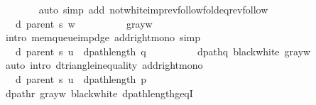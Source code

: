 \begin{isabellebody}
\ \ \ \ \ \ \isamarkupfalse%
\ {\isacharparenleft}{\kern0pt}auto\ simp\ add{\isacharcolon}{\kern0pt}\ not{\isacharunderscore}{\kern0pt}white{\isacharunderscore}{\kern0pt}imp{\isacharunderscore}{\kern0pt}rev{\isacharunderscore}{\kern0pt}follow{\isacharunderscore}{\kern0pt}fold{\isacharunderscore}{\kern0pt}eq{\isacharunderscore}{\kern0pt}rev{\isacharunderscore}{\kern0pt}follow{\isacharparenright}{\kern0pt}\isanewline
\ \ \ \ \isamarkupfalse%
\ \isamarkupfalse%
\ {\isachardoublequoteopen}{\isachardot}{\kern0pt}{\isachardot}{\kern0pt}{\isachardot}{\kern0pt}\ {\isasymle}\ d\ {\isacharparenleft}{\kern0pt}parent\ s{\isacharparenright}{\kern0pt}\ w\ {\isacharplus}{\kern0pt}\ {}{\isachardoublequoteclose}\isanewline
\ \ \ \ \ \ \isamarkupfalse%
\ gray{\isacharunderscore}{\kern0pt}w\isanewline
\ \ \ \ \ \ \isamarkupfalse%
\ {\isacharparenleft}{\kern0pt}intro\ mem{\isacharunderscore}{\kern0pt}queue{\isacharunderscore}{\kern0pt}imp{\isacharunderscore}{\kern0pt}d{\isacharunderscore}{\kern0pt}ge\ add{\isacharunderscore}{\kern0pt}right{\isacharunderscore}{\kern0pt}mono{\isacharparenright}{\kern0pt}\ simp\isanewline
\ \ \ \ \isamarkupfalse%
\ \isamarkupfalse%
\ {\isachardoublequoteopen}{\isachardot}{\kern0pt}{\isachardot}{\kern0pt}{\isachardot}{\kern0pt}\ {\isasymle}\ d\ {\isacharparenleft}{\kern0pt}parent\ s{\isacharparenright}{\kern0pt}\ u\ {\isacharplus}{\kern0pt}\ dpath{\isacharunderscore}{\kern0pt}length\ q\ {\isacharplus}{\kern0pt}\ {}{\isachardoublequoteclose}\isanewline
\ \ \ \ \ \ \isamarkupfalse%
\ dpath{\isacharunderscore}{\kern0pt}q\ black{\isacharunderscore}{\kern0pt}white\ gray{\isacharunderscore}{\kern0pt}w\isanewline
\ \ \ \ \ \ \isamarkupfalse%
\ {\isacharparenleft}{\kern0pt}auto\ intro{\isacharcolon}{\kern0pt}\ d{\isacharunderscore}{\kern0pt}triangle{\isacharunderscore}{\kern0pt}inequality\ add{\isacharunderscore}{\kern0pt}right{\isacharunderscore}{\kern0pt}mono{\isacharparenright}{\kern0pt}\isanewline
\ \ \ \ \isamarkupfalse%
\ \isamarkupfalse%
\ {\isachardoublequoteopen}{\isachardot}{\kern0pt}{\isachardot}{\kern0pt}{\isachardot}{\kern0pt}\ {\isasymle}\ d\ {\isacharparenleft}{\kern0pt}parent\ s{\isacharparenright}{\kern0pt}\ u\ {\isacharplus}{\kern0pt}\ dpath{\isacharunderscore}{\kern0pt}length\ p{\isachardoublequoteclose}\isanewline
\ \ \ \ \ \ \isamarkupfalse%
\ dpath{\isacharunderscore}{\kern0pt}r\ gray{\isacharunderscore}{\kern0pt}w\ black{\isacharunderscore}{\kern0pt}white\ dpath{\isacharunderscore}{\kern0pt}length{\isacharunderscore}{\kern0pt}geq{\isacharunderscore}{\kern0pt}{}I\isanewline

\end{isabellebody}
